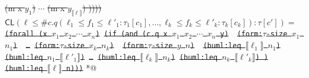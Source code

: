 \documentclass[10pt,fleqn,final]{scrreprt}
\newcommand*{\CL}{\ensuremath{\mathsf{CL}}\xspace}
\newenvironment{definitions}[0]{\medskip }{}
\newcommand{\sem}[1]{\mathopen\llbracket#1\mathclose\rrbracket}
\newcommand{\white}[1]{{\color{white}{#1}}}
\newcommand{\qqquad}{\white{x}\qquad}
\providecommand{\DIFdel}[1]{{\protect\color{red}\sout{#1}}}                      %
\providecommand{\DIFaddbegin}{} %
\providecommand{\DIFdelend}{} %
\begin{document}
\begin{definitions}
{%
\DIFdel{(m x  $y_1$)}%
\DIFdel{$\cdots$}%
\DIFdel{(m x $y_{\sem{\ell}}$) ))))}}
\DIFdel{$\CL(\ell \leq \mathsf{\#}c.q(\ell_1 \leq f_1 \leq \ell'_1: \tau_1[c_1], \ldots, \ell_k\leq f_k \leq \ell'_k: \tau_k[c_k]) : \tau[c'])=$}%
\texttt{\DIFdel{(forall (x $x_1$ $x_2$ $\cdots$  $x_n$)}%
\DIFdel{(if (and (c.q x $x_1$ $x_2$ $\cdots$  $x_n$ y) }%
\DIFdel{(form:$\tau$-size $x_1$ $n_1$) }%
\DIFdel{\ldots}%
\DIFdel{(form:$\tau$-size $x_k$ $n_k$) }%
\DIFdel{(form:$\tau$-size $y$ $n$) }%
\DIFdel{(buml:leq $\sem{\ell_1}$ $n_1$)}%
\DIFdel{(buml:leq $n_1$ $\sem{\ell'_1}$)}%
\DIFdel{\ldots}%
\DIFdel{(buml:leq $\sem{\ell_k}$ $n_k$)}%
\DIFdel{(buml:leq $n_k$ $\sem{\ell'_k}$) )}%
\DIFdel{(buml:leq $\sem{\ell}$ n)))}}
\DIFdelend %
 *@ \DIFaddbegin \begin{lstlisting}[language=clif, mathescape]

\end{lstlisting}
\end{definitions}
\end{document}
